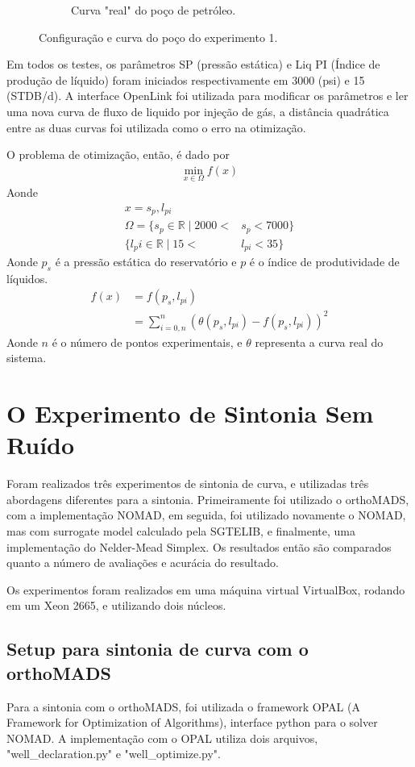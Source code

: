 \begin{figure}[H]
\begin{subfigure}{.75\textwidth}
  \caption{Curva "real" do poço de petróleo.}
  \label{fig:truth1}
\end{subfigure}
\caption{Configuração e curva do poço do experimento 1.}
\label{fig:setup1}
\end{figure}

Em todos os testes, os parâmetros SP (pressão estática) e Liq PI (Índice de produção de líquido) foram iniciados respectivamente em 3000 (psi) e 15 (STDB/d). A interface OpenLink foi utilizada para modificar os parâmetros e ler uma nova curva de fluxo de liquido por injeção de gás, a distância quadrática entre as duas curvas foi utilizada como o erro na otimização.

O problema de otimização, então, é dado por 
\begin{align}
\min\limits_{x \in \Omega} f(x)
\end{align}
Aonde
\begin{align}
x = {s_p, l_{pi}}\\
\Omega = \{s_p \in \mathbb{R} \mid 2000 < &s_p < 7000\}\\
          \{l_pi \in \mathbb{R} \mid  15 < &l_{pi} < 35\}
\end{align}
Aonde $p_s$ é a pressão estática do reservatório e $p$ é o índice de produtividade de líquidos.
\begin{align}
f(x) &= f(p_s, l_{pi}) \\
     &= \sum_{i=0,n}^n (\theta(p_s,l_{pi}) - f(p_s,l_{pi}))^2
\end{align}
Aonde $n$ é o número de pontos experimentais, e $\theta$ representa a curva real do sistema.
\chapter{O Experimento de Sintonia Sem Ruído}

Foram realizados três experimentos de sintonia de curva, e utilizadas três abordagens diferentes para a sintonia. Primeiramente foi utilizado o orthoMADS, com a implementação NOMAD, em seguida, foi utilizado novamente o NOMAD, mas com surrogate model calculado pela SGTELIB, e finalmente, uma implementação do Nelder-Mead Simplex. Os resultados então são comparados quanto a número de avaliações e acurácia do resultado.

Os experimentos foram realizados em uma máquina virtual VirtualBox, rodando em um Xeon 2665, e utilizando dois núcleos.

\section{Setup para sintonia de curva com o orthoMADS}
Para a sintonia com o orthoMADS, foi utilizada o framework OPAL (A Framework for Optimization of Algorithms), interface python para o solver NOMAD.
A implementação com o OPAL utiliza dois arquivos, "well\_declaration.py" e "well\_optimize.py".

